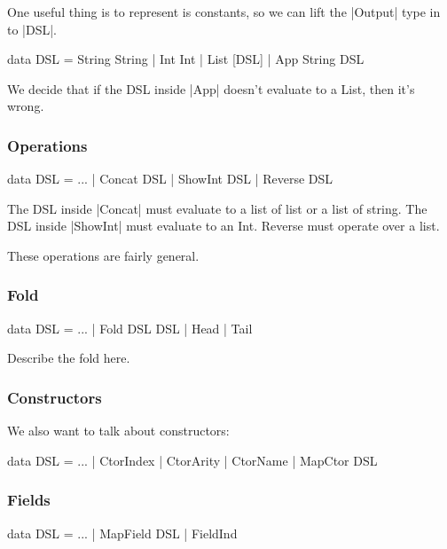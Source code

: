 \documentclass[preprint]{sigplanconf}
\begin{document}
One useful thing is to represent is constants, so we can lift the |Output| type in to |DSL|.

\begin{code}
data DSL = String String
         | Int Int
         | List [DSL]
         | App String DSL
\end{code}

We decide that if the DSL inside |App| doesn't evaluate to a List, then it's wrong.

\subsubsection{Operations}

\begin{code}
data DSL = ...
         | Concat DSL
         | ShowInt DSL
         | Reverse DSL
\end{code}

The DSL inside |Concat| must evaluate to a list of list or a list of string. The DSL inside |ShowInt| must evaluate to an Int. Reverse must operate over a list.

These operations are fairly general.

\subsubsection{Fold}

\begin{code}
data DSL = ...
         | Fold DSL DSL
         | Head
         | Tail
\end{code}

Describe the fold here.

\subsubsection{Constructors}

We also want to talk about constructors:

\begin{code}
data DSL = ...
         | CtorIndex
         | CtorArity
         | CtorName
         | MapCtor DSL
\end{code}

\subsubsection{Fields}

\begin{code}
data DSL = ...
         | MapField DSL
         | FieldInd
\end{code}
\end{document}

